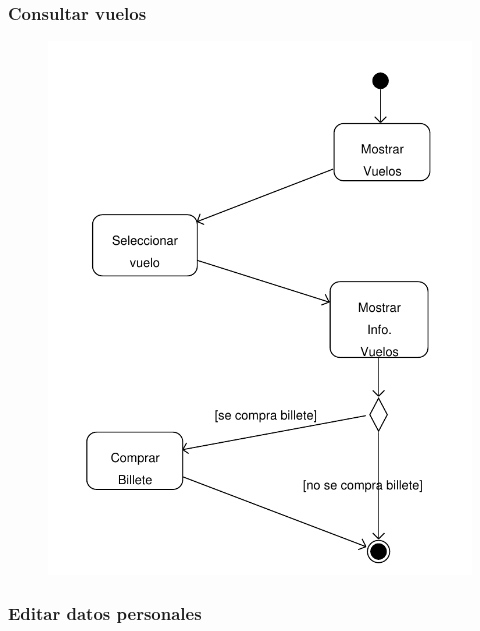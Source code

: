 \documentclass[11pt, a4paper, twoside, titlepage]{article}
\begin{document}
			\subsubsection{Consultar vuelos}
				\begin{figure}[H]\centering
					\includegraphics[scale=.71]{diagramas/da_consultarvuelos.pdf}
				\end{figure}
			
			\subsubsection{Editar datos personales}
				\begin{figure}[H]\centering
				\end{figure}
\end{document}
